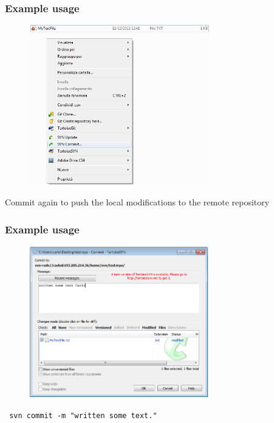 \documentclass[10pt]{beamer}
\begin{document}
\begin{frame}[fragile]
\frametitle{Example usage}
\begin{figure}[h]
 \centering
 \includegraphics[width=0.7\textwidth]{images/image12.png}
\end{figure}
Commit again to push the local modifications to the remote repository
\end{frame}

\begin{frame}[fragile]
\frametitle{Example usage}
\begin{figure}[h]
 \centering
 \includegraphics[width=0.7\textwidth]{images/image13.png}
\end{figure}
\begin{verbatim}
 svn commit -m "written some text."
\end{verbatim}
\end{frame}
\end{document}
